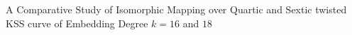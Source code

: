 







A Comparative Study of Isomorphic Mapping over Quartic and Sextic twisted KSS curve of Embedding Degree $k = 16$ and $18$

